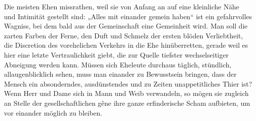 Die meisten Ehen missrathen, weil sie von Anfang an auf eine kleinliche Nähe und Intimität gestellt sind: „Alles mit einander gemein haben“ ist ein gefahrvolles Wagniss, bei dem bald aus der Gemeinschaft eine Gemeinheit wird. Man soll die zarten Farben der Ferne, den Duft und Schmelz der ersten blöden Verliebtheit, die Discretion des vorehelichen Verkehrs in die Ehe hinüberretten, gerade weil es hier eine letzte Vertraulichkeit giebt, die zur Quelle tiefster wechselseitiger Abneigung werden kann. Müssen sich Eheleute durchaus täglich, stündlich, allaugenblicklich sehen, muss man einander zu Bewusstsein bringen, dass der Mensch ein absonderndes, ausdünstendes und zu Zeiten unappetitliches Thier ist? Wenn Herr und Dame sich in Mann und Weib verwandeln, so mögen sie zugleich an Stelle der gesellschaftlichen gêne ihre ganze erfinderische Scham aufbieten, um vor einander möglich zu bleiben.
\par

